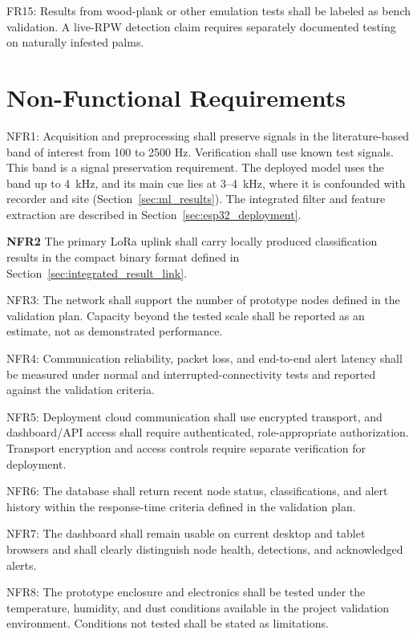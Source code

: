 \documentclass[12pt,a4paper,oneside]{memoir}
\newcommand{\earlierrevision}[1]{#1}
\newcommand{\newrevision}[1]{#1}
\begin{document}
\newrevision{FR15: Results from wood-plank or other emulation tests shall be labeled as bench validation. A live-RPW detection claim requires separately documented testing on naturally infested palms.}

\section{Non-Functional Requirements}
\label{sec:NFR}
 
\newrevision{NFR1: Acquisition and preprocessing shall preserve signals in the literature-based band of interest from 100 to 2500 Hz. Verification shall use known test signals. This band is a signal preservation requirement. The deployed model uses the band up to 4~kHz, and its main cue lies at 3--4~kHz, where it is confounded with recorder and site (Section~\ref{sec:ml_results}). The integrated filter and feature extraction are described in Section~\ref{sec:esp32_deployment}.}

\newrevision{\textbf{NFR2} The primary LoRa uplink shall carry locally produced classification results in the compact binary format defined in Section~\ref{sec:integrated_result_link}.}

\earlierrevision{NFR3: The network shall support the number of prototype nodes defined in the validation plan. Capacity beyond the tested scale shall be reported as an estimate, not as demonstrated performance.}

\earlierrevision{NFR4: Communication reliability, packet loss, and end-to-end alert latency shall be measured under normal and interrupted-connectivity tests and reported against the validation criteria.}

\newrevision{NFR5: Deployment cloud communication shall use encrypted transport, and dashboard/API access shall require authenticated, role-appropriate authorization. Transport encryption and access controls require separate verification for deployment.}

\earlierrevision{NFR6: The database shall return recent node status, classifications, and alert history within the response-time criteria defined in the validation plan.}

\earlierrevision{NFR7: The dashboard shall remain usable on current desktop and tablet browsers and shall clearly distinguish node health, detections, and acknowledged alerts.}

\earlierrevision{NFR8: The prototype enclosure and electronics shall be tested under the temperature, humidity, and dust conditions available in the project validation environment. Conditions not tested shall be stated as limitations.}
\end{document}

